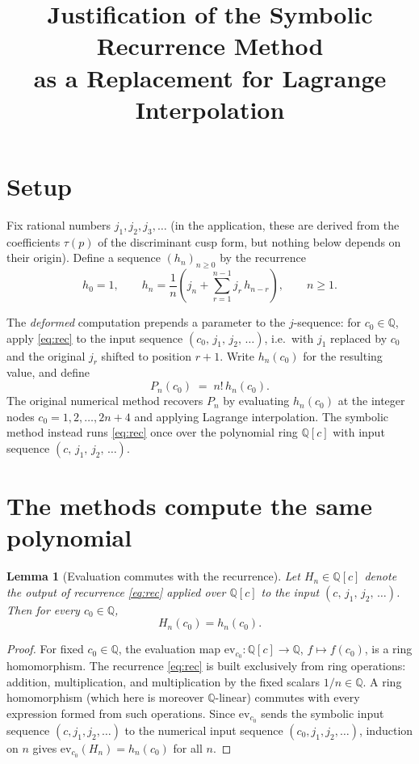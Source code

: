 \documentclass[11pt]{article}
\title{Justification of the Symbolic Recurrence Method\\
as a Replacement for Lagrange Interpolation}
\author{}
\date{}
\newtheorem{lemma}{Lemma}
\theoremstyle{remark}
\newcommand{\Q}{\mathbb{Q}}
\begin{document}
\maketitle

\section*{Setup}

Fix rational numbers $j_1, j_2, j_3, \dots$ (in the application, these are
derived from the coefficients $\tau(p)$ of the discriminant cusp form, but
nothing below depends on their origin). Define a sequence $(h_n)_{n \ge 0}$
by the recurrence
\begin{equation}\label{eq:rec}
h_0 = 1, \qquad
h_n = \frac{1}{n}\left( j_n + \sum_{r=1}^{n-1} j_r\, h_{n-r} \right),
\qquad n \ge 1.
\end{equation}

The \emph{deformed} computation prepends a parameter to the $j$-sequence:
for $c_0 \in \Q$, apply \eqref{eq:rec} to the input sequence
$(c_0,\, j_1,\, j_2,\, \dots)$, i.e.\ with $j_1$ replaced by $c_0$ and the
original $j_r$ shifted to position $r+1$. Write $h_n(c_0)$ for the
resulting value, and define
\[
P_n(c_0) \;=\; n!\, h_n(c_0).
\]
The original numerical method recovers $P_n$ by evaluating $h_n(c_0)$ at
the integer nodes $c_0 = 1, 2, \dots, 2n+4$ and applying Lagrange
interpolation. The symbolic method instead runs \eqref{eq:rec} once over
the polynomial ring $\Q[c]$ with input sequence $(c,\, j_1,\, j_2,\, \dots)$.

\section*{The methods compute the same polynomial}

\begin{lemma}[Evaluation commutes with the recurrence]\label{lem:eval}
Let $H_n \in \Q[c]$ denote the output of recurrence \eqref{eq:rec} applied
over $\Q[c]$ to the input $(c,\, j_1,\, j_2,\, \dots)$. Then for every
$c_0 \in \Q$,
\[
H_n(c_0) = h_n(c_0).
\]
\end{lemma}

\begin{proof}
For fixed $c_0 \in \Q$, the evaluation map
$\mathrm{ev}_{c_0} \colon \Q[c] \to \Q$, $f \mapsto f(c_0)$,
is a ring homomorphism. The recurrence \eqref{eq:rec} is built exclusively
from ring operations: addition, multiplication, and multiplication by the
fixed scalars $1/n \in \Q$. A ring homomorphism (which here is moreover
$\Q$-linear) commutes with every expression formed from such operations.
Since $\mathrm{ev}_{c_0}$ sends the symbolic input sequence
$(c, j_1, j_2, \dots)$ to the numerical input sequence
$(c_0, j_1, j_2, \dots)$, induction on $n$ gives
$\mathrm{ev}_{c_0}(H_n) = h_n(c_0)$ for all $n$.
\end{proof}
\end{document}
